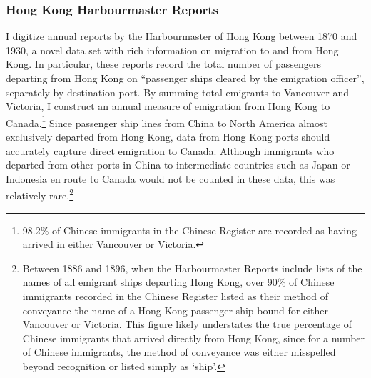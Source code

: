 \subsubsection{Hong Kong Harbourmaster Reports}
I digitize annual reports by the Harbourmaster of Hong Kong between 1870 and 1930, a novel data set with rich information on migration to and from Hong Kong. In particular, these reports record the total number of passengers departing from Hong Kong on ``passenger ships cleared by the emigration officer'', separately by destination port. By summing total emigrants to Vancouver and Victoria, I construct an annual measure of emigration from Hong Kong to Canada.\footnote{98.2\% of Chinese immigrants in the Chinese Register are recorded as having arrived in either Vancouver or Victoria.} 
Since passenger ship lines from China to North America almost exclusively departed from Hong Kong, data from Hong Kong ports should accurately capture direct emigration to Canada. Although immigrants who departed from other ports in China to intermediate countries such as Japan or Indonesia en route to Canada would not be counted in these data, this was relatively rare.\footnote{Between 1886 and 1896, when the Harbourmaster Reports include lists of the names of all emigrant ships departing Hong Kong, over 90\% of Chinese immigrants recorded in the Chinese Register listed as their method of conveyance the name of a Hong Kong passenger ship bound for either Vancouver or Victoria. This figure likely understates the true percentage of Chinese immigrants that arrived directly from Hong Kong, since for a number of Chinese immigrants, the method of conveyance was either misspelled beyond recognition or listed simply as `ship'.} 


